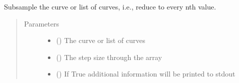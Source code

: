 \documentclass[letterpaper,10pt,english]{sphinxmanual}
\begin{document}
\begin{fulllineitems}
\label{\detokenize{pydv:pydvpy.subsample}}
Subsample the curve or list of curves, i.e., reduce to every nth value.

\begin{sphinxVerbatim}[commandchars=\\\{\}]
  
\end{sphinxVerbatim}

\begin{sphinxVerbatim}[commandchars=\\\{\}]
 
\end{sphinxVerbatim}

\begin{sphinxVerbatim}[commandchars=\\\{\}]
 
\end{sphinxVerbatim}
\begin{quote}\begin{description}
\item[{Parameters}] \leavevmode\begin{itemize}
\item {} 
 ({\hyperref[\detokenize{pydv:curve.Curve}]{}}) \textendash{} The curve or list of curves

\item {} 
 () \textendash{} The step size through the array

\item {} 
 () \textendash{} If True additional information will be printed to stdout

\end{itemize}

\end{description}\end{quote}

\end{fulllineitems}
\end{document}
